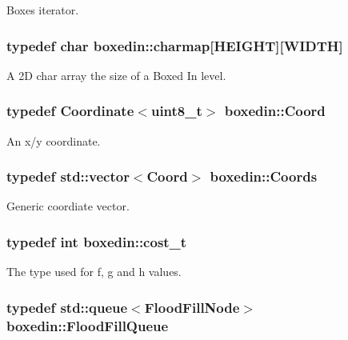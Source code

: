 Boxes iterator. \hypertarget{namespaceboxedin_a95e88d677e0a17d3f9e4a9b0de980c4f}{
\subsubsection[{charmap}]{\setlength{\rightskip}{0pt plus 5cm}typedef char boxedin\+::charmap\mbox{[}H\+E\+I\+G\+H\+T\mbox{]}\mbox{[}W\+I\+D\+T\+H\mbox{]}}}\label{namespaceboxedin_a95e88d677e0a17d3f9e4a9b0de980c4f}
A 2\+D char array the size of a Boxed In level. \hypertarget{namespaceboxedin_afc0dedc740afcefb60a4dac20d984b16}{
\subsubsection[{Coord}]{\setlength{\rightskip}{0pt plus 5cm}typedef {\bf Coordinate}$<$uint8\+\_\+t$>$ {\bf boxedin\+::\+Coord}}}\label{namespaceboxedin_afc0dedc740afcefb60a4dac20d984b16}
An x/y coordinate. \hypertarget{namespaceboxedin_adfad3f57ac730784b07eeef6e6244ceb}{
\subsubsection[{Coords}]{\setlength{\rightskip}{0pt plus 5cm}typedef std\+::vector$<${\bf Coord}$>$ {\bf boxedin\+::\+Coords}}}\label{namespaceboxedin_adfad3f57ac730784b07eeef6e6244ceb}
Generic coordiate vector. \hypertarget{namespaceboxedin_ae2b1ff7be48e8d543a64922e65788e04}{
\subsubsection[{cost\+\_\+t}]{\setlength{\rightskip}{0pt plus 5cm}typedef int {\bf boxedin\+::cost\+\_\+t}}}\label{namespaceboxedin_ae2b1ff7be48e8d543a64922e65788e04}
The type used for f, g and h values. \hypertarget{namespaceboxedin_a32593929ac9faf2a89b10156353111bf}{
\subsubsection[{Flood\+Fill\+Queue}]{\setlength{\rightskip}{0pt plus 5cm}typedef std\+::queue$<${\bf Flood\+Fill\+Node}$>$ {\bf boxedin\+::\+Flood\+Fill\+Queue}}}\label{namespaceboxedin_a32593929ac9faf2a89b10156353111bf}
